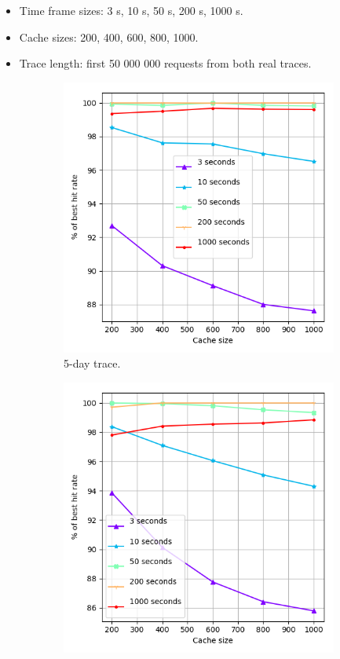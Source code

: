 \begin{itemize}
	\item Time frame sizes: 3 s, 10 s, 50 s, 200 s, 1000 s.
	\item Cache sizes: 200, 400, 600, 800, 1000.
	\item Trace length: first 50 000 000 requests from both real traces.
\end{itemize}

\begin{figure}[t!]
	\centering
	\captionsetup{justification=centering}
	\begin{subfigure}[b]{0.49\linewidth}
		\includegraphics[width=\linewidth]{pics/cache6.png}
		\caption{5-day trace.}
	\end{subfigure}
	\begin{subfigure}[b]{0.49\linewidth}
		\includegraphics[width=\linewidth]{pics/cache6_2.png}

\end{subfigure}
\end{figure}
